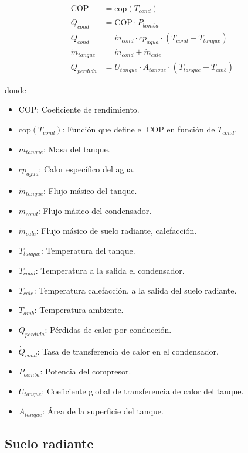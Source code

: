 \begin{align}
	\text{COP}        & = \text{cop}(T_{cond})                                         \\
	\dot{Q}_{cond}    & = \text{COP} \cdot P_{bomba}                                   \\
	\dot{Q}_{cond}    & = \dot{m}_{cond} \cdot cp_{agua} \cdot (T_{cond} - T_{tanque}) \\
	\dot{m}_{tanque}  & = \dot{m}_{cond} + \dot{m}_{cale}                              \\
	\dot{Q}_{perdida} & = U_{tanque} \cdot A_{tanque} \cdot (T_{tanque} - T_{amb})
\end{align}

donde

\begin{itemize}
	\item $\text{COP}$: Coeficiente de rendimiento.
	\item $\text{cop}(T_{cond})$: Función que define el COP en función de $T_{cond}$.
	\item $m_{tanque}$: Masa del tanque.
	\item $cp_{agua}$: Calor específico del agua.
	\item $\dot{m}_{tanque}$: Flujo másico del tanque.
	\item $\dot{m}_{cond}$: Flujo másico del condensador.
	\item $\dot{m}_{cale}$: Flujo másico de suelo radiante, calefacción.
	\item $T_{tanque}$: Temperatura del tanque.
	\item $T_{cond}$: Temperatura a la salida el condensador.
	\item $T_{cale}$: Temperatura calefacción, a la salida del suelo radiante.
	\item $T_{amb}$: Temperatura ambiente.
	\item $\dot{Q}_{perdida}$: Pérdidas de calor por conducción.
	\item $\dot{Q}_{cond}$: Tasa de transferencia de calor en el condensador.
	\item $P_{bomba}$: Potencia del compresor.
	\item $U_{tanque}$: Coeficiente global de transferencia de calor del tanque.
	\item $A_{tanque}$: Área de la superficie del tanque.
\end{itemize}


\subsection{Suelo radiante}

